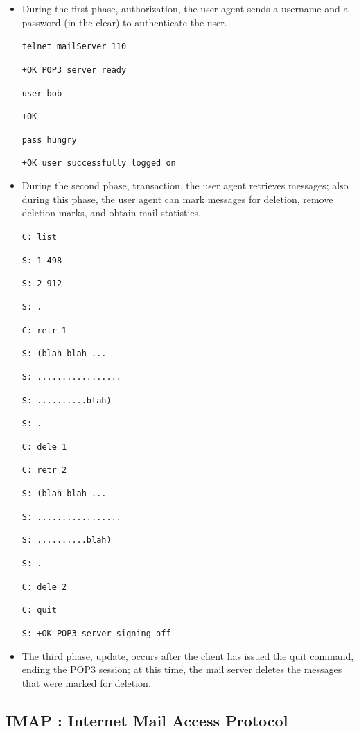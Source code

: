\documentclass[11pt]{article}
\begin{document}
\begin{itemize}
	\item During the first phase, authorization, the user agent sends a username and a password (in the clear) to authenticate the user.
	
	\texttt{telnet mailServer 110}

	\texttt{+OK POP3 server ready}

	\texttt{user bob}

	\texttt{+OK}

	\texttt{pass hungry}

	\texttt{+OK user successfully logged on}
	
	\item During the second phase, transaction, the user agent retrieves messages; also during this phase, the user agent can mark messages for deletion, remove deletion marks, and obtain mail statistics.
	
	\texttt{C: list}
	
	\texttt{S: 1 498 }
	
	\texttt{S: 2 912 }
	
	\texttt{S: .}
	
	\texttt{C: retr 1}
	
	\texttt{S: (blah blah ...}
	
	\texttt{S: .................}
	
	\texttt{S: ..........blah)}
	
	\texttt{S: .}
	
	\texttt{C: dele 1}
	
	\texttt{C: retr 2}
	
	\texttt{S: (blah blah ... }
	
	\texttt{S: .................}
	
	\texttt{S: ..........blah)}
	
	\texttt{S: .}
	
	\texttt{C: dele 2}

	\texttt{C: quit}
	
	\texttt{S: +OK POP3 server signing off}

	
	\item The third phase, update, occurs after the client has issued the quit command, ending the POP3 session; at this time, the mail server deletes the messages that were marked for deletion.
\end{itemize}

\subsection{IMAP : Internet Mail Access Protocol}
\end{document}
